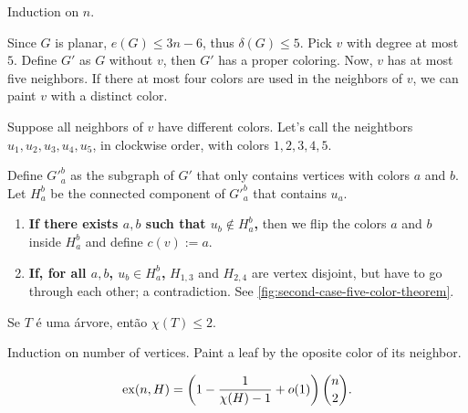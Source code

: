 \begin{dem}
	Induction on $n$.

	Since $G$ is planar, $e(G) \le 3n - 6$, thus $\delta(G) \le 5$. Pick $v$ with degree at most $5$. 
	Define $G'$ as $G$ without $v$, then $G'$ has a proper coloring. Now, $v$ has at most five neighbors. If there at most four colors are used in the neighbors of $v$, we can paint $v$ with a distinct color.

	Suppose all neighbors of $v$ have different colors. Let's call the neightbors $u_1, u_2, u_3, u_4, u_5$, in clockwise order, with colors $1, 2, 3, 4, 5$.

	Define $\left.G'\right._a^b$ as the subgraph of $G'$ that only contains vertices with colors $a$ and $b$. Let $H_a^b$ be the connected component of $\left.G'\right._a^b$ that contains $u_a$.
	\begin{enumerate}[label = \textbullet]
		\item \textbf{\boldmath If there exists $a, b$ such that $u_b \not\in H_a^b$,} then we flip the colors $a$ and $b$ inside $H_a^b$ and define $c(v) := a$.
		\item \textbf{\boldmath If, for all $a, b$, $u_b \in H_a^b$,} $H_{1, 3}$ and $H_{2, 4}$ are vertex disjoint, but have to go through each other; a contradiction. See \cref{fig:second-case-five-color-theorem}.
	\end{enumerate}
\end{dem}

\begin{lem}
	Se $T$ é uma árvore, então $\chi(T) \le 2$.
\end{lem}
\begin{sk}[1]
	Induction on number of vertices. Paint a leaf by the oposite color of its neighbor.
\end{sk}

\begin{thm}\label{thm:erdos-stone-1946}
	\[
		\operatorname{ex}(n, H) = \left(1 - \frac{1}{\chi(H) - 1} + o(1)\right)\binom{n}{2}.
	\]
\end{thm}


